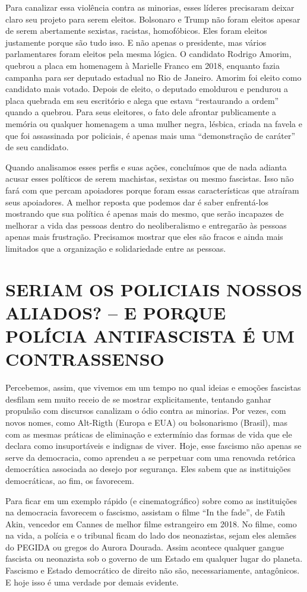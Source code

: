 Para canalizar essa violência contra as minorias, esses líderes precisaram deixar claro seu projeto para serem eleitos. Bolsonaro e Trump não foram eleitos apesar de serem abertamente sexistas, racistas, homofóbicos. Eles foram eleitos justamente porque são tudo isso. E não apenas o presidente, mas vários parlamentares foram eleitos pela mesma lógica. O candidato Rodrigo Amorim, quebrou a placa em homenagem à Marielle Franco em 2018, enquanto fazia campanha para ser deputado estadual no Rio de Janeiro. Amorim foi eleito como candidato mais votado. Depois de eleito, o deputado emoldurou e pendurou a placa quebrada em seu escritório e alega que estava “restaurando a ordem” quando a quebrou. Para seus eleitores, o fato dele afrontar publicamente a memória ou qualquer homenagem a uma mulher negra, lésbica, criada na favela e que foi assassinada por policiais, é apenas mais uma “demonstração de caráter” de seu candidato.

Quando analisamos esses perfis e suas ações, concluímos que de nada adianta acusar esses políticos de serem machistas, sexistas ou mesmo fascistas. Isso não fará com que percam apoiadores porque foram essas características que atraíram seus apoiadores. A melhor reposta que podemos dar é saber enfrentá-los mostrando que sua política é apenas mais do mesmo, que serão incapazes de melhorar a vida das pessoas dentro do neoliberalismo e entregarão às pessoas apenas mais frustração. Precisamos mostrar que eles são fracos e ainda mais limitados que a organização e solidariedade entre as pessoas.

\section{SERIAM OS POLICIAIS NOSSOS ALIADOS? – E PORQUE POLÍCIA ANTIFASCISTA É UM CONTRASSENSO}

Percebemos, assim, que vivemos em um tempo no qual ideias e emoções fascistas desfilam sem muito receio de se mostrar explicitamente, tentando ganhar propulsão com discursos canalizam o ódio contra as minorias. Por vezes, com novos nomes, como Alt-Rigth (Europa e EUA) ou bolsonarismo (Brasil), mas com as mesmas práticas de eliminação e extermínio das formas de vida que ele declara como insuportáveis e indignas de viver. Hoje, esse fascismo não apenas se serve da democracia, como aprendeu a se perpetuar com uma renovada retórica democrática associada ao desejo por segurança. Eles sabem que as instituições democráticas, ao fim, os favorecem.

Para ficar em um exemplo rápido (e cinematográfico) sobre como as instituições na democracia favorecem o fascismo, assistam o filme “In the fade”, de Fatih Akin, vencedor em Cannes de melhor filme estrangeiro em 2018. No filme, como na vida, a polícia e o tribunal ficam do lado dos neonazistas, sejam eles alemães do PEGIDA ou gregos do Aurora Dourada. Assim acontece qualquer gangue fascista ou neonazista sob o governo de um Estado em qualquer lugar do planeta. Fascismo e Estado democrático de direito não são, necessariamente, antagônicos. E hoje isso é uma verdade por demais evidente.

